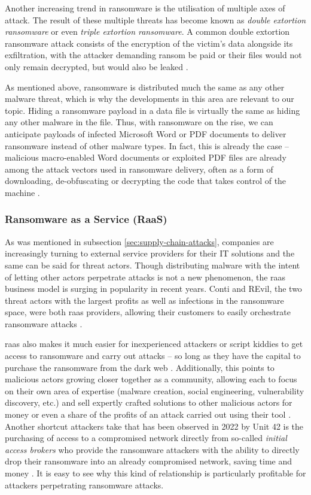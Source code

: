 Another increasing trend in ransomware is the utilisation of multiple axes of attack. The result of these multiple
threats has become known as \emph{double extortion ransomware} or even \emph{triple extortion ransomware}. A common
double extortion ransomware attack consists of the encryption of the victim's data alongside its exfiltration,
with the attacker demanding ransom be paid or their files would not only remain decrypted, but would also be leaked
\cite{enisa_threat_landscape, unit42-ransomware}.

As mentioned above, ransomware is distributed much the same as any other malware threat, which is why the developments
in this area are relevant to our topic. Hiding a ransomware payload in a data file is virtually the same as hiding
any other malware in the file. Thus, with ransomware on the rise, we can anticipate payloads of infected Microsoft
Word or PDF documents to deliver ransomware instead of other malware types. In fact, this is already the case -- 
malicious macro-enabled Word documents or exploited PDF files are already among the attack vectors used in ransomware
delivery, often as a form of downloading, de-obfuscating or decrypting the code that takes control of the machine
\cite[p.~8-10]{ransomware-book}.

\subsubsection{Ransomware as a Service (RaaS)}
As was mentioned in subsection \ref{sec:supply-chain-attacks}, companies are increasingly turning to external service providers 
for their IT solutions and the same can be said for threat actors. Though distributing malware with the intent of
letting other actors perpetrate attacks is not a new phenomenon, the \acrfull{raas} business model is surging in
popularity in recent years. Conti and REvil, the two threat actors with the largest profits as well as infections in the ransomware 
space, were both \acrshort{raas} providers, allowing their customers to easily orchestrate ransomware attacks
\cite{enisa_threat_landscape, unit42-ransomware}.

\acrshort{raas} also makes it much easier for inexperienced attackers or script kiddies to get access to ransomware
and carry out attacks -- so long as they have the capital to purchase the ransomware from the dark web
\cite{social-engineering-ransomware-vector}. Additionally, this points to malicious actors growing closer together
as a community, allowing each to focus on their own area of expertise (malware creation, social engineering,
vulnerability discovery, etc.) and sell expertly crafted solutions to other malicious actors for money or even 
a share of the profits of an attack carried out using their tool \cite{enisa_threat_landscape}.
Another shortcut attackers take that has been observed in 2022 by Unit 42 is the purchasing of access to a compromised 
network directly from so-called \emph{initial access brokers} who provide the ransomware attackers with the ability to
directly drop their ransomware into an already compromised network, saving time and money \cite{unit42-ransomware}.
It is easy to see why this kind of relationship is particularly profitable for attackers perpetrating ransomware
attacks. 

